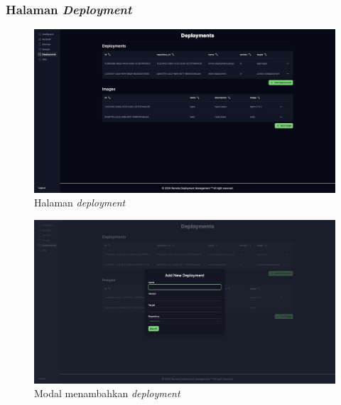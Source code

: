 \pagebreak

\subsubsection{Halaman \textit{Deployment}}

\begin{figure}
  \centering
  \includegraphics[width=1\textwidth]{resources/chapter-4/dashboard/deployment-page.jpg}
  \caption{Halaman \textit{deployment}}
  \label{fig:halaman-deployment}
\end{figure}


\begin{figure}
  \centering
  \includegraphics[width=1\textwidth]{resources/chapter-4/dashboard/deployment-page-add-deployment.jpg}
  \caption{Modal menambahkan \textit{deployment}}
  \label{fig:halaman-deployment-add-deployment}
\end{figure}

